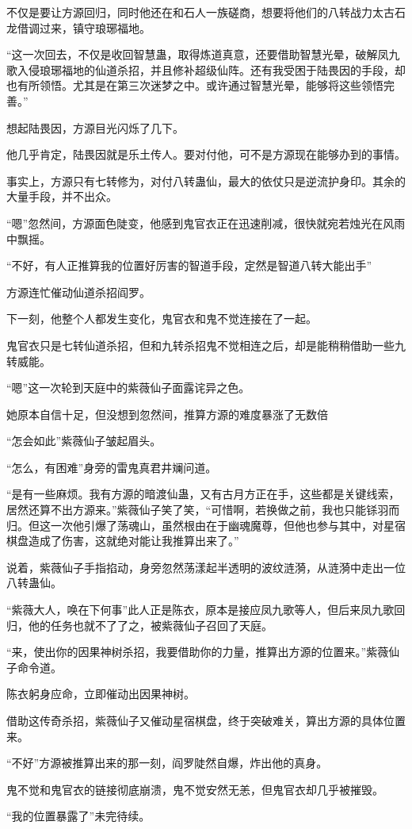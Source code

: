 \begin{this_body}
不仅是要让方源回归，同时他还在和石人一族磋商，想要将他们的八转战力太古石龙借调过来，镇守琅琊福地。

“这一次回去，不仅是收回智慧蛊，取得炼道真意，还要借助智慧光晕，破解凤九歌入侵琅琊福地的仙道杀招，并且修补超级仙阵。还有我受困于陆畏因的手段，却也有所领悟。尤其是在第三次迷梦之中。或许通过智慧光晕，能够将这些领悟完善。”

想起陆畏因，方源目光闪烁了几下。

他几乎肯定，陆畏因就是乐土传人。要对付他，可不是方源现在能够办到的事情。

事实上，方源只有七转修为，对付八转蛊仙，最大的依仗只是逆流护身印。其余的大量手段，并不出众。

“嗯”忽然间，方源面色陡变，他感到鬼官衣正在迅速削减，很快就宛若烛光在风雨中飘摇。

“不好，有人正推算我的位置好厉害的智道手段，定然是智道八转大能出手”

方源连忙催动仙道杀招阎罗。

下一刻，他整个人都发生变化，鬼官衣和鬼不觉连接在了一起。

鬼官衣只是七转仙道杀招，但和九转杀招鬼不觉相连之后，却是能稍稍借助一些九转威能。

“嗯”这一次轮到天庭中的紫薇仙子面露诧异之色。

她原本自信十足，但没想到忽然间，推算方源的难度暴涨了无数倍

“怎会如此”紫薇仙子皱起眉头。

“怎么，有困难”身旁的雷鬼真君井斓问道。

“是有一些麻烦。我有方源的暗渡仙蛊，又有古月方正在手，这些都是关键线索，居然还算不出方源来。”紫薇仙子笑了笑，“可惜啊，若换做之前，我也只能铩羽而归。但这一次他引爆了荡魂山，虽然根由在于幽魂魔尊，但他也参与其中，对星宿棋盘造成了伤害，这就绝对能让我推算出来了。”

说着，紫薇仙子手指掐动，身旁忽然荡漾起半透明的波纹涟漪，从涟漪中走出一位八转蛊仙。

“紫薇大人，唤在下何事”此人正是陈衣，原本是接应凤九歌等人，但后来凤九歌回归，他的任务也就不了了之，被紫薇仙子召回了天庭。

“来，使出你的因果神树杀招，我要借助你的力量，推算出方源的位置来。”紫薇仙子命令道。

陈衣躬身应命，立即催动出因果神树。

借助这传奇杀招，紫薇仙子又催动星宿棋盘，终于突破难关，算出方源的具体位置来。

“不好”方源被推算出来的那一刻，阎罗陡然自爆，炸出他的真身。

鬼不觉和鬼官衣的链接彻底崩溃，鬼不觉安然无恙，但鬼官衣却几乎被摧毁。

“我的位置暴露了”未完待续。

\end{this_body}

